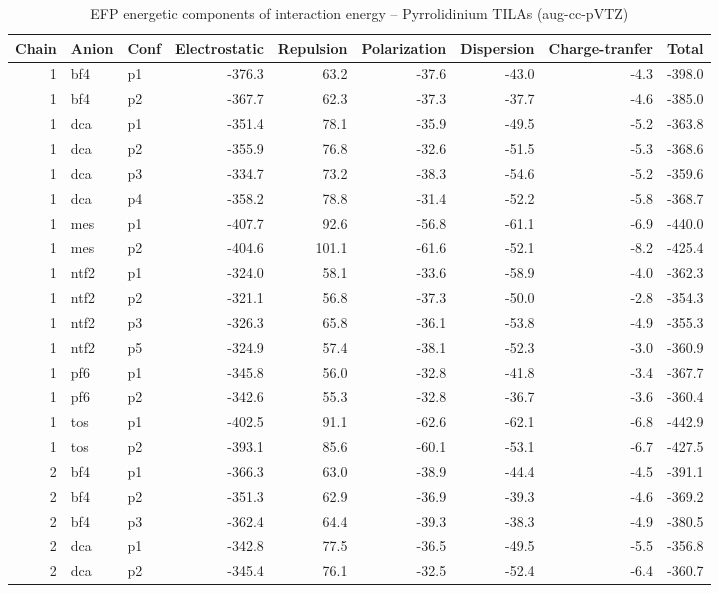 \documentclass[a4paper]{article}
\begin{document}
\begin{table}[ht]
\centering
\footnotesize
\scriptsize
\caption{EFP energetic components of interaction energy -- Pyrrolidinium TILAs (aug-cc-pVTZ)}
\begin{tabular}{rllrrrrrr}
  \hline
Chain & Anion & Conf & Electrostatic & Repulsion & Polarization & Dispersion & Charge-tranfer & Total \\ 
  \hline
 1 & bf4 & p1 & -376.3 & 63.2 & -37.6 & -43.0 & -4.3 & -398.0 \\ 
   1 & bf4 & p2 & -367.7 & 62.3 & -37.3 & -37.7 & -4.6 & -385.0 \\ 
   1 & dca & p1 & -351.4 & 78.1 & -35.9 & -49.5 & -5.2 & -363.8 \\ 
   1 & dca & p2 & -355.9 & 76.8 & -32.6 & -51.5 & -5.3 & -368.6 \\ 
   1 & dca & p3 & -334.7 & 73.2 & -38.3 & -54.6 & -5.2 & -359.6 \\ 
   1 & dca & p4 & -358.2 & 78.8 & -31.4 & -52.2 & -5.8 & -368.7 \\ 
   1 & mes & p1 & -407.7 & 92.6 & -56.8 & -61.1 & -6.9 & -440.0 \\ 
   1 & mes & p2 & -404.6 & 101.1 & -61.6 & -52.1 & -8.2 & -425.4 \\ 
   1 & ntf2 & p1 & -324.0 & 58.1 & -33.6 & -58.9 & -4.0 & -362.3 \\ 
   1 & ntf2 & p2 & -321.1 & 56.8 & -37.3 & -50.0 & -2.8 & -354.3 \\ 
   1 & ntf2 & p3 & -326.3 & 65.8 & -36.1 & -53.8 & -4.9 & -355.3 \\ 
   1 & ntf2 & p5 & -324.9 & 57.4 & -38.1 & -52.3 & -3.0 & -360.9 \\ 
   1 & pf6 & p1 & -345.8 & 56.0 & -32.8 & -41.8 & -3.4 & -367.7 \\ 
   1 & pf6 & p2 & -342.6 & 55.3 & -32.8 & -36.7 & -3.6 & -360.4 \\ 
   1 & tos & p1 & -402.5 & 91.1 & -62.6 & -62.1 & -6.8 & -442.9 \\ 
   1 & tos & p2 & -393.1 & 85.6 & -60.1 & -53.1 & -6.7 & -427.5 \\ 
   2 & bf4 & p1 & -366.3 & 63.0 & -38.9 & -44.4 & -4.5 & -391.1 \\ 
   2 & bf4 & p2 & -351.3 & 62.9 & -36.9 & -39.3 & -4.6 & -369.2 \\ 
   2 & bf4 & p3 & -362.4 & 64.4 & -39.3 & -38.3 & -4.9 & -380.5 \\ 
   2 & dca & p1 & -342.8 & 77.5 & -36.5 & -49.5 & -5.5 & -356.8 \\ 
   2 & dca & p2 & -345.4 & 76.1 & -32.5 & -52.4 & -6.4 & -360.7 \\ 

\end{tabular}
\end{table}
\end{document}

